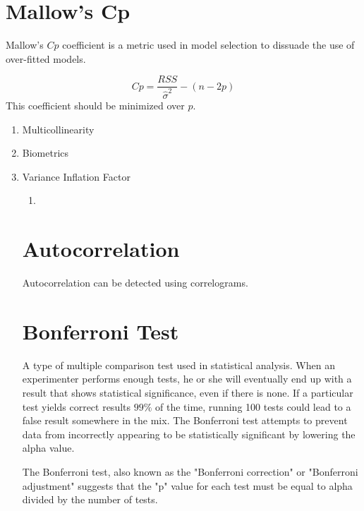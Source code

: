 \section{Mallow's Cp}
Mallow's $Cp$ coefficient is a metric used in model selection to
dissuade the use of over-fitted models.

\begin{equation}
Cp= \frac{RSS}{\hat{\sigma}^{2}}-(n-2p)
\end{equation}
This coefficient should be minimized over $p$.

\begin{enumerate}
	\item Multicollinearity
	\item Biometrics
	\item Variance Inflation Factor
	\begin{enumerate}
		\item 
	
	
	
\end{enumerate}
\newpage


\section{Autocorrelation}

Autocorrelation can be detected using correlograms.








\section{Bonferroni Test}

A type of multiple comparison test used in statistical analysis. When an experimenter performs enough tests, he or she will eventually end up with a result that shows statistical significance, even if there is none. If a particular test yields correct results $99\%$ of the time, running 100 tests could lead to a false result somewhere in the mix. The Bonferroni test attempts to prevent data from incorrectly appearing to be statistically significant by lowering the alpha value.

The Bonferroni test, also known as the "Bonferroni correction" or "Bonferroni adjustment" suggests that the "p" value for each test must be equal to alpha divided by the number of tests.

\end{enumerate}

